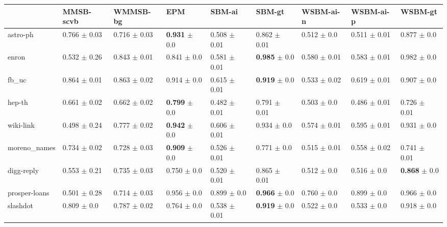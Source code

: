 \begin{tabular}{lllllllll}
\hline
               & MMSB-scvb          & WMMSB-bg        & EPM                      & SBM-ai           & SBM-gt                    & WSBM-ai-n        & WSBM-ai-p        & WSBM-gt                  \\ 
\hline
 astro-ph      & 0.766 $\pm$ 0.03 & 0.716 $\pm$ 0.03 & \textbf{0.931} $\pm$ 0.0 & 0.508 $\pm$ 0.01 & 0.862 $\pm$ 0.01          & 0.512 $\pm$ 0.0  & 0.511 $\pm$ 0.01 & 0.877 $\pm$ 0.0 \\
 enron         & 0.532 $\pm$ 0.26 & 0.843 $\pm$ 0.01 & 0.841 $\pm$ 0.0          & 0.581 $\pm$ 0.01 & \textbf{0.985} $\pm$ 0.0  & 0.580 $\pm$ 0.01 & 0.583 $\pm$ 0.01 & 0.982 $\pm$ 0.0          \\
 fb\_uc        & 0.864 $\pm$ 0.01 & 0.863 $\pm$ 0.02 & 0.914 $\pm$ 0.0          & 0.615 $\pm$ 0.01 & \textbf{0.919} $\pm$ 0.0  & 0.533 $\pm$ 0.02 & 0.619 $\pm$ 0.01 & 0.907 $\pm$ 0.0          \\
 hep-th        & 0.661 $\pm$ 0.02 & 0.662 $\pm$ 0.02 & \textbf{0.799} $\pm$ 0.0 & 0.482 $\pm$ 0.01 & 0.791 $\pm$ 0.01          & 0.503 $\pm$ 0.0  & 0.486 $\pm$ 0.01 & 0.726 $\pm$ 0.01         \\
 wiki-link     & 0.498 $\pm$ 0.24 & 0.777 $\pm$ 0.02 & \textbf{0.942} $\pm$ 0.0 & 0.606 $\pm$ 0.01 & 0.934          $\pm$ 0.0  & 0.574 $\pm$ 0.01 & 0.595 $\pm$ 0.01 & 0.931 $\pm$ 0.0          \\
 moreno\_names & 0.734 $\pm$ 0.02 & 0.728 $\pm$ 0.03 & \textbf{0.909} $\pm$ 0.0 & 0.526 $\pm$ 0.01 & 0.771          $\pm$ 0.0  & 0.515 $\pm$ 0.01 & 0.558 $\pm$ 0.02 & 0.741 $\pm$ 0.01         \\
 digg-reply    & 0.553 $\pm$ 0.21 & 0.735 $\pm$ 0.03 & 0.750 $\pm$ 0.0          & 0.520 $\pm$ 0.01 & 0.865          $\pm$ 0.01 & 0.512 $\pm$ 0.0  & 0.516 $\pm$ 0.0  & \textbf{0.868} $\pm$ 0.0 \\
 prosper-loans & 0.501 $\pm$ 0.28 & 0.714 $\pm$ 0.03 & 0.956 $\pm$ 0.0          & 0.899 $\pm$ 0.0  & \textbf{0.966} $\pm$ 0.0  & 0.760 $\pm$ 0.0  & 0.899 $\pm$ 0.0  & 0.966 $\pm$ 0.0          \\
 slashdot      & 0.809 $\pm$ 0.0  & 0.787 $\pm$ 0.02 & 0.764 $\pm$ 0.0          & 0.538 $\pm$ 0.01 & \textbf{0.919} $\pm$ 0.0  & 0.522 $\pm$ 0.0  & 0.533 $\pm$ 0.0  & 0.918 $\pm$ 0.0          \\
\hline
\end{tabular}
